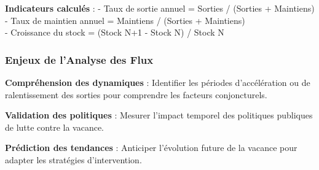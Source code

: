 \documentclass[11pt]{article}
\begin{document}
\textbf{Indicateurs calculés} : - Taux de sortie annuel = Sorties /
(Sorties + Maintiens) - Taux de maintien annuel = Maintiens / (Sorties +
Maintiens)\\
- Croissance du stock = (Stock N+1 - Stock N) / Stock N

\subsubsection{Enjeux de l'Analyse des
Flux}\label{enjeux-de-lanalyse-des-flux}

\textbf{Compréhension des dynamiques} : Identifier les périodes
d'accélération ou de ralentissement des sorties pour comprendre les
facteurs conjoncturels.

\textbf{Validation des politiques} : Mesurer l'impact temporel des
politiques publiques de lutte contre la vacance.

\textbf{Prédiction des tendances} : Anticiper l'évolution future de la
vacance pour adapter les stratégies d'intervention.
\end{document}

